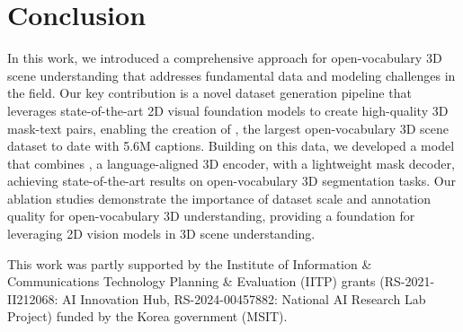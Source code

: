 \section{Conclusion}
\label{sec:conclusion}


In this work, we introduced a comprehensive approach for open-vocabulary 3D scene understanding that addresses fundamental data and modeling challenges in the field.
Our key contribution is a novel dataset generation pipeline that leverages state-of-the-art 2D visual foundation models to create high-quality 3D mask-text pairs, enabling the creation of \dataname, the largest open-vocabulary 3D scene dataset to date with 5.6M captions.
Building on this data, we developed a model that combines \nickname, a language-aligned 3D encoder, with a lightweight mask decoder, achieving state-of-the-art results on open-vocabulary 3D segmentation tasks.
Our ablation studies demonstrate the importance of dataset scale and annotation quality for open-vocabulary 3D understanding, providing a foundation for leveraging 2D vision models in 3D scene understanding.




This work was partly supported by the Institute of Information \& Communications Technology Planning \& Evaluation (IITP) grants (RS-2021-II212068: AI Innovation Hub, RS-2024-00457882: National AI Research Lab Project) funded by the Korea government (MSIT).
